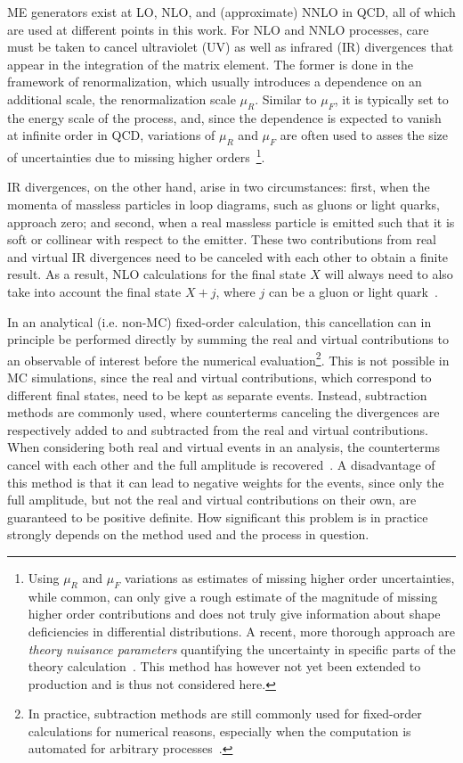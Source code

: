 ME generators exist at LO, NLO, and (approximate) NNLO in QCD, all of which are used at different points in this work. For NLO and NNLO processes, care must be taken to cancel ultraviolet (UV) as well as infrared (IR) divergences that appear in the integration of the matrix element. The former is done in the framework of renormalization, which usually introduces a dependence on an additional scale, the renormalization scale $\mu_R$. Similar to $\mu_F$, it is typically set to the energy scale of the process, and, since the dependence is expected to vanish at infinite order in QCD, variations of $\mu_R$ and $\mu_F$ are often used to asses the size of uncertainties due to missing higher orders~\cite{Schwartz:2014sze}\footnote{Using $\mu_R$ and $\mu_F$ variations as estimates of missing higher order uncertainties, while common, can only give a rough estimate of the magnitude of missing higher order contributions and does not truly give information about shape deficiencies in differential distributions. A recent, more thorough approach are \textit{theory nuisance parameters} quantifying the uncertainty in specific parts of the theory calculation~\cite{Tackmann:2024kci}. This method has however not yet been extended to \ttbar production and is thus not considered here.}.

IR divergences, on the other hand, arise in two circumstances: first, when the momenta of massless particles in loop diagrams, such as gluons or light quarks, approach zero; and second, when a real massless particle is emitted such that it is soft or collinear with respect to the emitter. These two contributions from real and virtual IR divergences need to be canceled with each other to obtain a finite result. As a result, NLO calculations for the final state $X$ will always need to also take into account the final state $X+j$, where $j$ can be a gluon or light quark~\cite{Nason:2012pr}. 

In an analytical (i.e. non-MC) fixed-order calculation, this cancellation can in principle be performed directly by summing the real and virtual contributions to an observable of interest before the numerical evaluation\footnote{In practice, subtraction methods are still commonly used for fixed-order calculations for numerical reasons, especially when the computation is automated for arbitrary processes~\cite{Skands:2012ts}.}. This is not possible in MC simulations, since the real and virtual contributions, which correspond to different final states, need to be kept as separate events. Instead, subtraction methods are commonly used, where counterterms canceling the divergences are respectively added to and subtracted from the real and virtual contributions. When considering both real and virtual events in an analysis, the counterterms cancel with each other and the full amplitude is recovered~\cite{Skands:2012ts}. A disadvantage of this method is that it can lead to negative weights for the events, since only the full amplitude, but not the real and virtual contributions on their own, are guaranteed to be positive definite. How significant this problem is in practice strongly depends on the method used and the process in question.

